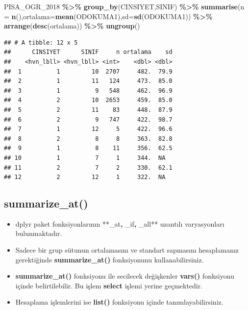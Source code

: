 \documentclass[
  oneside]{book}
\newenvironment{Shaded}{\begin{snugshade}}{\end{snugshade}}
\newcommand{\AttributeTok}[1]{\textcolor[rgb]{0.13,0.29,0.53}{#1}}
\newcommand{\FunctionTok}[1]{\textcolor[rgb]{0.13,0.29,0.53}{\textbf{#1}}}
\newcommand{\NormalTok}[1]{#1}
\newcommand{\SpecialCharTok}[1]{\textcolor[rgb]{0.81,0.36,0.00}{\textbf{#1}}}
\begin{document}
\begin{Shaded}
\begin{Highlighting}[]
\NormalTok{PISA\_OGR\_2018 }\SpecialCharTok{\%\textgreater{}\%}
  \FunctionTok{group\_by}\NormalTok{(CINSIYET,SINIF) }\SpecialCharTok{\%\textgreater{}\%}
  \FunctionTok{summarise}\NormalTok{(}\AttributeTok{n =} \FunctionTok{n}\NormalTok{(),}\AttributeTok{ortalama=}\FunctionTok{mean}\NormalTok{(ODOKUMA1),}\AttributeTok{sd=}\FunctionTok{sd}\NormalTok{(ODOKUMA1)) }\SpecialCharTok{\%\textgreater{}\%}
  \FunctionTok{arrange}\NormalTok{(}\FunctionTok{desc}\NormalTok{(ortalama)) }\SpecialCharTok{\%\textgreater{}\%} 
  \FunctionTok{ungroup}\NormalTok{()}
\end{Highlighting}
\end{Shaded}

\begin{verbatim}
## # A tibble: 12 x 5
##      CINSIYET      SINIF     n ortalama    sd
##    <hvn_lbll> <hvn_lbll> <int>    <dbl> <dbl>
##  1          1         10  2707     482.  79.9
##  2          1         11   124     473.  85.0
##  3          1          9   548     462.  96.9
##  4          2         10  2653     459.  85.0
##  5          2         11    83     448.  87.9
##  6          2          9   747     422.  98.7
##  7          1         12     5     422.  96.6
##  8          2          8     8     363.  82.8
##  9          1          8    11     356.  62.5
## 10          1          7     1     344.  NA  
## 11          2          7     2     330.  62.1
## 12          2         12     1     322.  NA
\end{verbatim}

\hypertarget{summarize_at}{%
\subsection{summarize\_at()}\label{summarize_at}}

\begin{itemize}
\item
  dplyr paket fonksiyonlarının **\_at\textbf{, }\_if\textbf{, }\_all** uzantılı varyasyonları bulunmaktadır.
\item
  Sadece bir grup sütunun ortalamasını ve standart sapmasını hesaplamanız gerektiğinde \textbf{summarize\_at()} fonksiyonunu kullanabilirsiniz.
\item
  \textbf{summarize\_at()} fonksiyonu ile secilecek değişkenler \textbf{vars()}
  fonksiyonu içinde belirtilebilir. Bu işlem \textbf{select} işlemi yerine geçmektedir.
\item
  Hesaplama işlemlerini ise \textbf{list()} fonksiyonu içinde tanımlayabilirsiniz.
\end{itemize}
\end{document}
